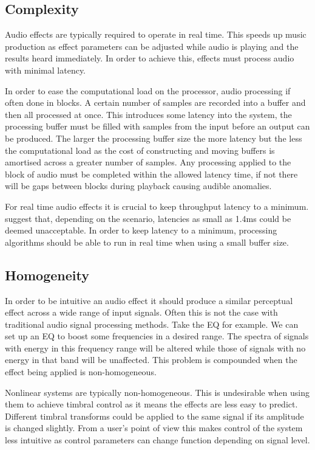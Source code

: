 	\subsection{Complexity}
	\label{sec:ExcitationEvaluation-Evaluation-Complexity}
		Audio effects are typically required to operate in real time. This speeds up music production as effect
		parameters can be adjusted while audio is playing and the results heard immediately. In order to achieve
		this, effects must process audio with minimal latency. 

		In order to ease the computational load on the processor, audio processing if often done in blocks. A
		certain number of samples are recorded into a buffer and then all processed at once. This introduces some
		latency into the system, the processing buffer must be filled with samples from the input before an output
		can be produced. The larger the processing buffer size the more latency but the less the computational load
		as the cost of constructing and moving buffers is amortised across a greater number of samples. Any
		processing applied to the block of audio must be completed within the allowed latency time, if not there
		will be gaps between blocks during playback causing audible anomalies.

		For real time audio effects it is crucial to keep throughput latency to a minimum. \citet{lester2007the}
		suggest that, depending on the scenario, latencies as small as 1.4ms could be deemed unacceptable. In order
		to keep latency to a minimum, processing algorithms should be able to run in real time when using a small
		buffer size.

	\subsection{Homogeneity}
	\label{sec:ExcitationEvaluation-Evaluation-Homogeneity}
		In order to be intuitive an audio effect it should produce a similar perceptual effect across a wide range
		of input signals. Often this is not the case with traditional audio signal processing methods. Take the EQ
		for example. We can set up an EQ to boost some frequencies in a desired range. The spectra of signals with
		energy in this frequency range will be altered while those of signals with no energy in that band will be
		unaffected. This problem is compounded when the effect being applied is non-homogeneous.
		
		Nonlinear systems are typically non-homogeneous. This is undesirable when using them to achieve timbral
		control as it means the effects are less easy to predict. Different timbral transforms could be applied to
		the same signal if its amplitude is changed slightly. From a user's point of view this makes control of the
		system less intuitive as control parameters can change function depending on signal level.

